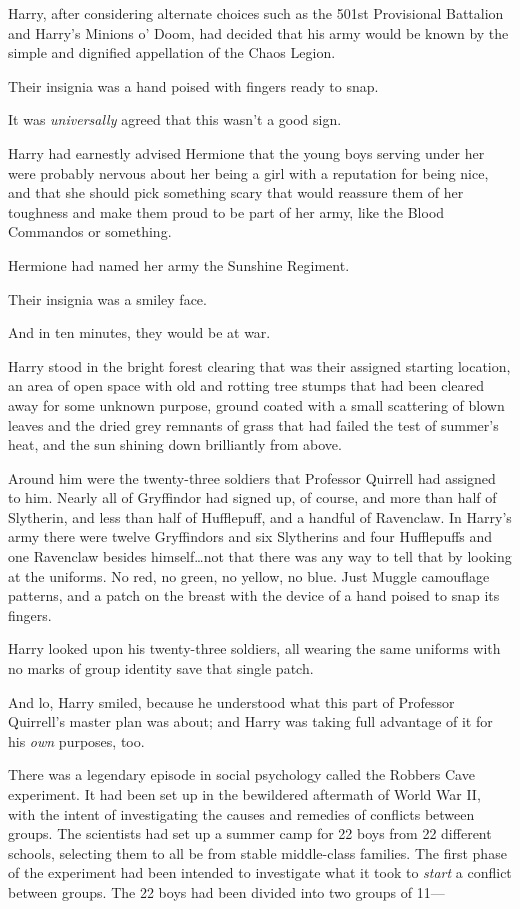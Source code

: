 Harry, after considering alternate choices such as the 501st Provisional Battalion and Harry’s Minions o’ Doom, had decided that his army would be known by the simple and dignified appellation of the Chaos Legion.

Their insignia was a hand poised with fingers ready to snap.

It was \emph{universally} agreed that this wasn’t a good sign.

Harry had earnestly advised Hermione that the young boys serving under her were probably nervous about her being a girl with a reputation for being nice, and that she should pick something scary that would reassure them of her toughness and make them proud to be part of her army, like the Blood Commandos or something.

Hermione had named her army the Sunshine Regiment.

Their insignia was a smiley face.

And in ten minutes, they would be at war.

Harry stood in the bright forest clearing that was their assigned starting location, an area of open space with old and rotting tree stumps that had been cleared away for some unknown purpose, ground coated with a small scattering of blown leaves and the dried grey remnants of grass that had failed the test of summer’s heat, and the sun shining down brilliantly from above.

Around him were the twenty-three soldiers that Professor Quirrell had assigned to him. Nearly all of Gryffindor had signed up, of course, and more than half of Slytherin, and less than half of Hufflepuff, and a handful of Ravenclaw. In Harry’s army there were twelve Gryffindors and six Slytherins and four Hufflepuffs and one Ravenclaw besides himself…not that there was any way to tell that by looking at the uniforms. No red, no green, no yellow, no blue. Just Muggle camouflage patterns, and a patch on the breast with the device of a hand poised to snap its fingers.

Harry looked upon his twenty-three soldiers, all wearing the same uniforms with no marks of group identity save that single patch.

And lo, Harry smiled, because he understood what this part of Professor Quirrell’s master plan was about; and Harry was taking full advantage of it for his \emph{own} purposes, too.

There was a legendary episode in social psychology called the Robbers Cave experiment. It had been set up in the bewildered aftermath of World War II, with the intent of investigating the causes and remedies of conflicts between groups. The scientists had set up a summer camp for 22 boys from 22 different schools, selecting them to all be from stable middle-class families. The first phase of the experiment had been intended to investigate what it took to \emph{start} a conflict between groups. The 22 boys had been divided into two groups of 11—

